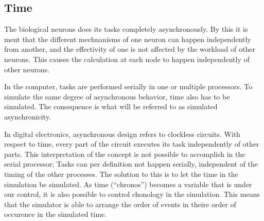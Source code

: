 	




	\subsection{Time}
	\label{ssecTime}
	The biological neurons does its tasks completely asynchronously.
	By this it is ment that the different mechnanisms of one neuron can happen independently from another, and the effectivity of one is not affected by the workload of other neurons.
	This causes the calculation at each node to happen independently of other neurons.


	In the computer, tasks are performed serially in one or multiple processors.
	To simulate the same degree of asynchronous behavior, time also has to be simulated. %
	The consequence is what will be referred to as simulated asynchronicity.

	In digital electronics, asynchronous design refers to clockless circuits. 
	With respect to time, every part of the circuit executes its task independently of other parts.
	This interpretation of the concept is not possible to accomplish in the serial processor; Tasks can per definition not happen serially, independent of the timing of the other processes.
	The solution to this is to let the time in the simulation be simulated.
	As time (``chronos'') becomes a variable that is under our control, it is also possible to control chonology in the simulation. %
	This means that the simulator is able to arrange the order of events in theire order of occurence in the simulated time. %
	
